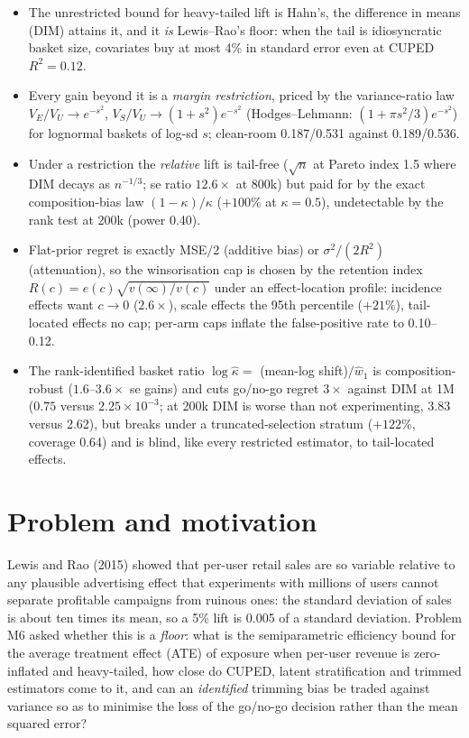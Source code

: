 \begin{keyideas}
\begin{itemize}
\item The unrestricted bound for heavy-tailed lift is Hahn's, the difference in means (DIM) attains it, and it \emph{is} Lewis--Rao's floor: when the tail is idiosyncratic basket size, covariates buy at most 4\% in standard error even at CUPED $R^2 = 0.12$.
\item Every gain beyond it is a \emph{margin restriction}, priced by the variance-ratio law $V_E/V_U \to e^{-s^2}$, $V_S/V_U \to (1+s^2)e^{-s^2}$ (Hodges--Lehmann: $(1 + \pi s^2/3)e^{-s^2}$) for lognormal baskets of log-sd $s$; clean-room 0.187/0.531 against 0.189/0.536.
\item Under a restriction the \emph{relative} lift is tail-free ($\sqrt n$ at Pareto index 1.5 where DIM decays as $n^{-1/3}$; se ratio $12.6\times$ at 800k) but paid for by the exact composition-bias law $(1-\kappa)/\kappa$ ($+100\%$ at $\kappa = 0.5$), undetectable by the rank test at 200k (power 0.40).
\item Flat-prior regret is exactly MSE$/2$ (additive bias) or $\sigma^2/(2R^2)$ (attenuation), so the winsorisation cap is chosen by the retention index $R(c) = e(c)\sqrt{v(\infty)/v(c)}$ under an effect-location profile: incidence effects want $c \to 0$ ($2.6\times$), scale effects the 95th percentile ($+21\%$), tail-located effects no cap; per-arm caps inflate the false-positive rate to 0.10--0.12.
\item The rank-identified basket ratio $\log\hat\kappa = $ (mean-log shift)$/\hat w_1$ is composition-robust ($1.6$--$3.6\times$ se gains) and cuts go/no-go regret $3\times$ against DIM at 1M ($0.75$ versus $2.25 \times 10^{-3}$; at 200k DIM is worse than not experimenting, 3.83 versus 2.62), but breaks under a truncated-selection stratum ($+122\%$, coverage 0.64) and is blind, like every restricted estimator, to tail-located effects.
\end{itemize}
\end{keyideas}

\section{Problem and motivation}

Lewis and Rao (2015) showed that per-user retail sales are so variable relative to any plausible advertising effect that experiments with millions of users cannot separate profitable campaigns from ruinous ones: the standard deviation of sales is about ten times its mean, so a 5\% lift is 0.005 of a standard deviation. Problem M6 asked whether this is a \emph{floor}: what is the semiparametric efficiency bound for the average treatment effect (ATE) of exposure when per-user revenue is zero-inflated and heavy-tailed, how close do CUPED, latent stratification and trimmed estimators come to it, and can an \emph{identified} trimming bias be traded against variance so as to minimise the loss of the go/no-go decision rather than the mean squared error?

